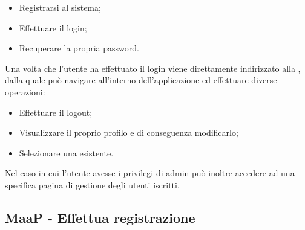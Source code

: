 \begin{itemize}

	\item Registrarsi al sistema;
	\item Effettuare il login;
	\item Recuperare la propria password.

\end{itemize}

Una volta che l'utente ha effettuato il login viene direttamente indirizzato alla , dalla quale può navigare all'interno dell'applicazione ed effettuare diverse operazioni:

\begin{itemize}

	\item Effettuare il logout;
	\item Visualizzare il proprio profilo e di conseguenza modificarlo;
	\item Selezionare una  esistente.

\end{itemize}

Nel caso in cui l'utente avesse i privilegi di admin può inoltre accedere ad una specifica pagina di gestione degli utenti iscritti.

\subsection{MaaP - Effettua registrazione}

